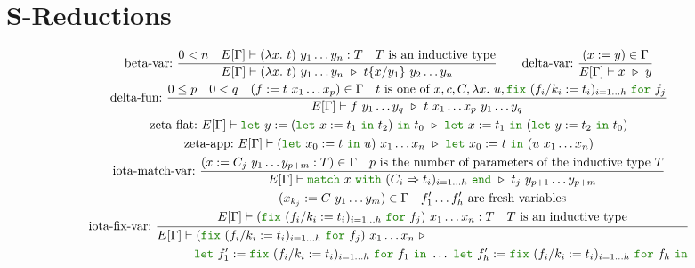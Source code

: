 \documentclass[a4paper,fleqn]{article}
\newcommand{\kwlet}{\mbox{\color{mygreen}\ttfamily let}}
\newcommand{\kwin}{\mbox{\color{mygreen}\ttfamily in}}
\newcommand{\kwmatch}{\mbox{\color{mygreen}\ttfamily match}}
\newcommand{\kwwith}{\mbox{\color{mygreen}\ttfamily with}}
\newcommand{\kwend}{\mbox{\color{mygreen}\ttfamily end}}
\newcommand{\kwfix}{\mbox{\color{mygreen}\ttfamily fix}}
\newcommand{\kwfor}{\mbox{\color{mygreen}\ttfamily for}}
\newcommand{\lam}[2]{\lambda #1.~#2}
\newcommand{\letin}[3]{\kwlet~#1:=#2~\kwin~#3}
\newcommand{\letinB}[2]{\kwlet~#1:=#2~\kwin}
\newcommand{\match}[4]{\kwmatch~#1~\kwwith~(#2 \Rightarrow #3)_{#4}~\kwend}
\newcommand{\fix}[4]{\kwfix~(#1 := #2)_{#3}~\kwfor~#4}
\newcommand{\subst}[3]{#1\{#2/#3\}}
\begin{document}
\section{S-Reductions}\label{sec:s-reductions}
\begin{gather*}
  \text{beta-var:}~
    \dfrac{
      0 < n \quad
      E[\Gamma] \vdash (\lam{x}{t})~y_1\dots y_n : T \quad
      \text{$T$ is an inductive type}
    }{
      E[\Gamma] \vdash (\lam{x}{t})~y_1\dots y_n~\triangleright~\subst{t}{x}{y_1}~y_2\dots y_n
    } \qquad
  \text{delta-var:}~
    \dfrac{(x:=y) \in \Gamma}{E[\Gamma] \vdash x~\triangleright~y} \\
  \text{delta-fun:}~
     \dfrac
     {
       0 \leq p \quad
       0 < q \quad
       (f := t~x_1\ldots x_p) \in \Gamma \quad
       \text{$t$ is one of $x, c, C, \lam{x}{u}, \fix{f_i/k_i}{t_i}{i=1\dots h}{f_j}$}
     }{
       E[\Gamma] \vdash f~y_1\ldots y_q
                        ~\triangleright~
                        t~x_1\ldots x_p~y_1\dots y_q
     } \\
  \text{zeta-flat:}~
    E[\Gamma] \vdash \letin{y}{(\letin{x}{t_1}{t_2})}{t_0}
                       ~\triangleright~
                       \letin{x}{t_1}{(\letin{y}{t_2}{t_0})} \\
  \text{zeta-app:}~
    E[\Gamma] \vdash
     (\letin{x_0}{t}{u})~x_1\ldots x_n
     ~\triangleright~
     \letin{x_0}{t}{(u~x_1\ldots x_n)} \\
  \text{iota-match-var:}~
    \dfrac
    {
      (x:=C_j~y_1\ldots y_{p+m}:T) \in \Gamma \quad
      \text{$p$ is the number of parameters of the inductive type $T$}
    }{
      E[\Gamma] \vdash
      \match{x}{C_i}{t_i}{i=1\dots h}
      ~\triangleright~
      t_j~y_{p+1}\ldots y_{p+m}
    } \\
  \text{iota-fix-var:}~
    \dfrac
    {
      \begin{gathered}
        (x_{k_j} := C~y_1\ldots y_m) \in \Gamma \quad
        \text{$f'_1\dots f'_h$ are fresh variables} \\
        E[\Gamma] \vdash (\fix{f_i/k_i}{t_i}{i=1\dots h}{f_j})~x_1\ldots x_n : T \quad
        \text{$T$ is an inductive type}
      \end{gathered}
    }{
      \begin{aligned}
        E[\Gamma] &\vdash (\fix{f_i/k_i}{t_i}{i=1\dots h}{f_j})~x_1\ldots x_n ~\triangleright~ \\
                  &\quad \letinB{f'_1}{\fix{f_i/k_i}{t_i}{i=1\dots h}{f_1}}
                         ~\dots~
                         \letinB{f'_h}{\fix{f_i/k_i}{t_i}{i=1\dots h}{f_h}} \\

\end{aligned}}
\end{gather*}
\end{document}
